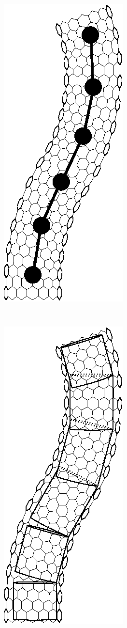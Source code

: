\begin{figure}[t!]
		~
		\begin{subfigure}[t]{.33\textwidth}
			\centering
			\includegraphics{./fig/ch1/NanotubeParticle.eps}
			\caption{\label{subfig:NanotubeParticle}}
		\end{subfigure}%
		~		
		\begin{subfigure}[t]{.33\textwidth}
			\centering
			\includegraphics{./fig/ch1/NanotubeCylinder.eps}

\end{subfigure}
\end{figure}
